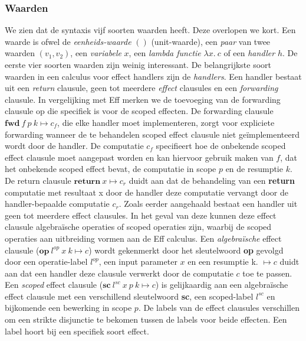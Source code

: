 \subsubsection{Waarden}
We zien dat de syntaxis vijf soorten waarden heeft. Deze overlopen we kort.
Een waarde is ofwel de \emph{eenheids-waarde} $()$ (unit-waarde), een \emph{paar} van twee waarden $(v_{1}, v_{2})$, een \emph{variabele} $x$, een \emph{lambda functie} $\lambda x.\:c$ of een \emph{handler} $h$. De eerste vier soorten waarden zijn weinig interessant. \newline
De belangrijkste soort waarden in een calculus voor effect handlers zijn de \emph{handlers}. Een handler bestaat uit een \emph{return} clausule, geen tot meerdere \emph{effect} clausules en een \emph{forwarding} clausule. In vergelijking met Eff merken we de toevoeging van de forwarding clausule op die specifiek is voor de scoped effecten. \newline 
De forwarding clausule $\textbf{fwd}\:f\:p\:k \mapsto c_{f}$, die elke handler moet implementeren, zorgt voor expliciete forwarding wanneer de te behandelen scoped effect clausule niet geïmplementeerd wordt door de handler. De computatie $c_{f}$ specifieert hoe de onbekende scoped effect clausule moet aangepast worden en kan hiervoor gebruik maken van $f$, dat het onbekende scoped effect bevat, de computatie in scope $p$ en de resumptie $k$. \newline
De return clausule $\textbf{return}\:x \mapsto c_{r}$ duidt aan dat de behandeling van een \textbf{return} computatie met resultaat x door de handler deze computatie vervangt door de handler-bepaalde computatie $c_{r}$. \newline
Zoals eerder aangehaald bestaat een handler uit geen tot meerdere effect clausules. In het geval van deze kunnen deze effect clausule algebraïsche operaties of scoped operaties zijn, waarbij de scoped operaties aan uitbreiding vormen aan de Eff calculus. Een \emph{algebraïsche} effect clausule ($\textbf{op} \ l^{op} 
 \ x \ k \mapsto c$) wordt gekenmerkt door het sleutelwoord \textbf{op} gevolgd door een operatie-label $l^{op}$, een input parameter $x$ en een resumptie k. $\mapsto c$ duidt aan dat een handler deze clausule verwerkt door de computatie $c$ toe te passen. Een \emph{scoped} effect clausule ($\textbf{sc} \ l^{sc} \ x \ p \ k \mapsto c$) is gelijkaardig aan een algebraïsche effect clausule met een verschillend sleutelwoord \textbf{sc}, een scoped-label $l^{sc}$ en bijkomende een bewerking in scope $p$. \newline 
 De labels van de effect clausules verschillen om een strikte disjunctie te bekomen tussen de labels voor beide effecten. Een label hoort bij een specifiek soort effect.

